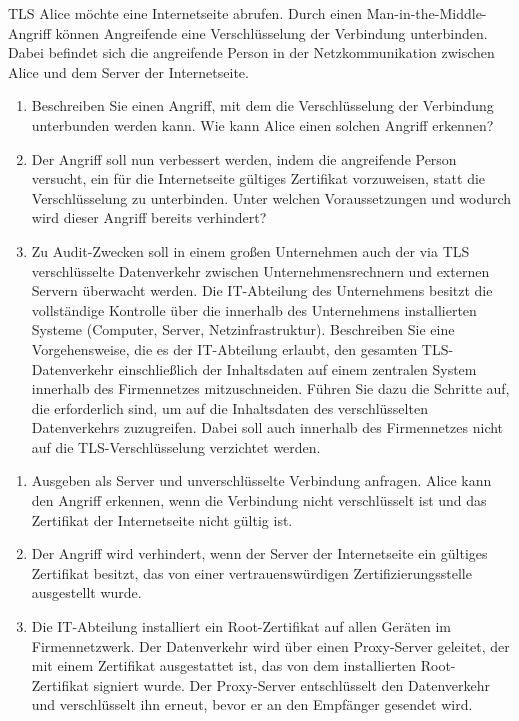 \documentclass{article}
\begin{document}
\begin{exercise}{TLS}
  Alice möchte eine Internetseite abrufen. Durch einen Man-in-the-Middle-Angriff können Angreifende eine Verschlüsselung der Verbindung unterbinden. Dabei befindet sich die angreifende Person in der Netzkommunikation zwischen Alice und dem Server der Internetseite.
  \begin{enumerate}
    \item Beschreiben Sie einen Angriff, mit dem die Verschlüsselung der Verbindung unterbunden werden kann. Wie kann Alice einen solchen Angriff erkennen?
    \item Der Angriff soll nun verbessert werden, indem die angreifende Person versucht, ein für die Internetseite gültiges Zertifikat vorzuweisen, statt die Verschlüsselung zu unterbinden. Unter welchen Voraussetzungen und wodurch wird dieser Angriff bereits verhindert?
    \item Zu Audit-Zwecken soll in einem großen Unternehmen auch der via TLS verschlüsselte Datenverkehr zwischen Unternehmensrechnern und externen Servern überwacht werden. Die IT-Abteilung des Unternehmens besitzt die vollständige Kontrolle über die innerhalb des Unternehmens installierten Systeme (Computer, Server, Netzinfrastruktur). Beschreiben Sie eine Vorgehensweise, die es der IT-Abteilung erlaubt, den gesamten TLS-Datenverkehr einschließlich der Inhaltsdaten auf einem zentralen System innerhalb des Firmennetzes mitzuschneiden. Führen Sie dazu die Schritte auf, die erforderlich sind, um auf die Inhaltsdaten des verschlüsselten Datenverkehrs zuzugreifen. Dabei soll auch innerhalb des Firmennetzes nicht auf die TLS-Verschlüsselung verzichtet werden.
  \end{enumerate}

  \begin{solution}
    \begin{enumerate}
        \item Ausgeben als Server und unverschlüsselte Verbindung anfragen. Alice kann den Angriff erkennen, wenn die Verbindung nicht verschlüsselt ist und das Zertifikat der Internetseite nicht gültig ist.
        \item Der Angriff wird verhindert, wenn der Server der Internetseite ein gültiges Zertifikat besitzt, das von einer vertrauenswürdigen Zertifizierungsstelle ausgestellt wurde.
        \item Die IT-Abteilung installiert ein Root-Zertifikat auf allen Geräten im Firmennetzwerk. Der Datenverkehr wird über einen Proxy-Server geleitet, der mit einem Zertifikat ausgestattet ist, das von dem installierten Root-Zertifikat signiert wurde. Der Proxy-Server entschlüsselt den Datenverkehr und verschlüsselt ihn erneut, bevor er an den Empfänger gesendet wird.
    \end{enumerate}
  \end{solution}
\end{exercise}
\end{document}
